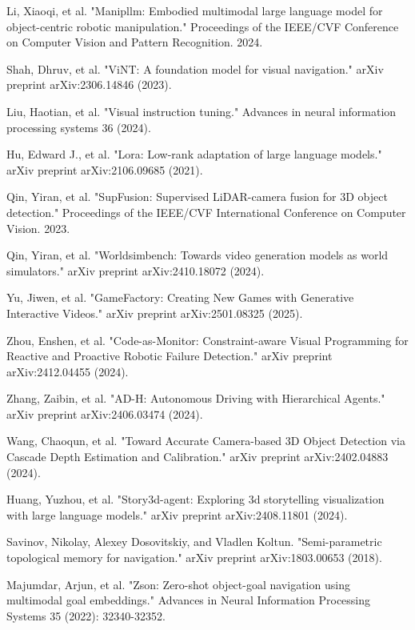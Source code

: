 \begin{thebibliography}{99}
 Li, Xiaoqi, et al. "Manipllm: Embodied multimodal large language model for object-centric robotic manipulation." Proceedings of the IEEE/CVF Conference on Computer Vision and Pattern Recognition. 2024.

 Shah, Dhruv, et al. "ViNT: A foundation model for visual navigation." arXiv preprint arXiv:2306.14846 (2023).

 Liu, Haotian, et al. "Visual instruction tuning." Advances in neural information processing systems 36 (2024).

 Hu, Edward J., et al. "Lora: Low-rank adaptation of large language models." arXiv preprint arXiv:2106.09685 (2021).

 Qin, Yiran, et al. "SupFusion: Supervised LiDAR-camera fusion for 3D object detection." Proceedings of the IEEE/CVF International Conference on Computer Vision. 2023.

 Qin, Yiran, et al. "Worldsimbench: Towards video generation models as world simulators." arXiv preprint arXiv:2410.18072 (2024).

 Yu, Jiwen, et al. "GameFactory: Creating New Games with Generative Interactive Videos." arXiv preprint arXiv:2501.08325 (2025).

 Zhou, Enshen, et al. "Code-as-Monitor: Constraint-aware Visual Programming for Reactive and Proactive Robotic Failure Detection." arXiv preprint arXiv:2412.04455 (2024).

 Zhang, Zaibin, et al. "AD-H: Autonomous Driving with Hierarchical Agents." arXiv preprint arXiv:2406.03474 (2024).

 Wang, Chaoqun, et al. "Toward Accurate Camera-based 3D Object Detection via Cascade Depth Estimation and Calibration." arXiv preprint arXiv:2402.04883 (2024).

 Huang, Yuzhou, et al. "Story3d-agent: Exploring 3d storytelling visualization with large language models." arXiv preprint arXiv:2408.11801 (2024).

 Savinov, Nikolay, Alexey Dosovitskiy, and Vladlen Koltun. "Semi-parametric topological memory for navigation." arXiv preprint arXiv:1803.00653 (2018).

 Majumdar, Arjun, et al. "Zson: Zero-shot object-goal navigation using multimodal goal embeddings." Advances in Neural Information Processing Systems 35 (2022): 32340-32352.


\end{thebibliography}
